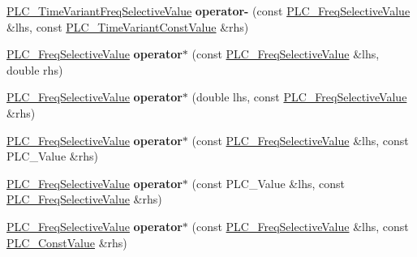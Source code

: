 \begin{DoxyCompactItemize}
\item 
\hypertarget{classns3_1_1PLC__FreqSelectiveValue_a22bab1bb6d37a86e6bd3e6b979d911ea}{\hyperlink{classns3_1_1PLC__TimeVariantFreqSelectiveValue}{\-P\-L\-C\-\_\-\-Time\-Variant\-Freq\-Selective\-Value} {\bfseries operator-\/} (const \hyperlink{classns3_1_1PLC__FreqSelectiveValue}{\-P\-L\-C\-\_\-\-Freq\-Selective\-Value} \&lhs, const \hyperlink{classns3_1_1PLC__TimeVariantConstValue}{\-P\-L\-C\-\_\-\-Time\-Variant\-Const\-Value} \&rhs)}\label{classns3_1_1PLC__FreqSelectiveValue_a22bab1bb6d37a86e6bd3e6b979d911ea}

\item 
\hypertarget{classns3_1_1PLC__FreqSelectiveValue_a6581d0648a4e7f1d372f55e51791cedd}{\hyperlink{classns3_1_1PLC__FreqSelectiveValue}{\-P\-L\-C\-\_\-\-Freq\-Selective\-Value} {\bfseries operator$\ast$} (const \hyperlink{classns3_1_1PLC__FreqSelectiveValue}{\-P\-L\-C\-\_\-\-Freq\-Selective\-Value} \&lhs, double rhs)}\label{classns3_1_1PLC__FreqSelectiveValue_a6581d0648a4e7f1d372f55e51791cedd}

\item 
\hypertarget{classns3_1_1PLC__FreqSelectiveValue_a3d35c89b1576eadf5527bfaee21b7165}{\hyperlink{classns3_1_1PLC__FreqSelectiveValue}{\-P\-L\-C\-\_\-\-Freq\-Selective\-Value} {\bfseries operator$\ast$} (double lhs, const \hyperlink{classns3_1_1PLC__FreqSelectiveValue}{\-P\-L\-C\-\_\-\-Freq\-Selective\-Value} \&rhs)}\label{classns3_1_1PLC__FreqSelectiveValue_a3d35c89b1576eadf5527bfaee21b7165}

\item 
\hypertarget{classns3_1_1PLC__FreqSelectiveValue_a0f370d8675c59ab45174eda3caa9620d}{\hyperlink{classns3_1_1PLC__FreqSelectiveValue}{\-P\-L\-C\-\_\-\-Freq\-Selective\-Value} {\bfseries operator$\ast$} (const \hyperlink{classns3_1_1PLC__FreqSelectiveValue}{\-P\-L\-C\-\_\-\-Freq\-Selective\-Value} \&lhs, const \-P\-L\-C\-\_\-\-Value \&rhs)}\label{classns3_1_1PLC__FreqSelectiveValue_a0f370d8675c59ab45174eda3caa9620d}

\item 
\hypertarget{classns3_1_1PLC__FreqSelectiveValue_ab9b63465b5d9a2a271b3ff873308d290}{\hyperlink{classns3_1_1PLC__FreqSelectiveValue}{\-P\-L\-C\-\_\-\-Freq\-Selective\-Value} {\bfseries operator$\ast$} (const \-P\-L\-C\-\_\-\-Value \&lhs, const \hyperlink{classns3_1_1PLC__FreqSelectiveValue}{\-P\-L\-C\-\_\-\-Freq\-Selective\-Value} \&rhs)}\label{classns3_1_1PLC__FreqSelectiveValue_ab9b63465b5d9a2a271b3ff873308d290}

\item 
\hypertarget{classns3_1_1PLC__FreqSelectiveValue_a6a17fe9e638b3515f4cf30f940d524b1}{\hyperlink{classns3_1_1PLC__FreqSelectiveValue}{\-P\-L\-C\-\_\-\-Freq\-Selective\-Value} {\bfseries operator$\ast$} (const \hyperlink{classns3_1_1PLC__FreqSelectiveValue}{\-P\-L\-C\-\_\-\-Freq\-Selective\-Value} \&lhs, const \hyperlink{classns3_1_1PLC__ConstValue}{\-P\-L\-C\-\_\-\-Const\-Value} \&rhs)}\label{classns3_1_1PLC__FreqSelectiveValue_a6a17fe9e638b3515f4cf30f940d524b1}


\end{DoxyCompactItemize}
